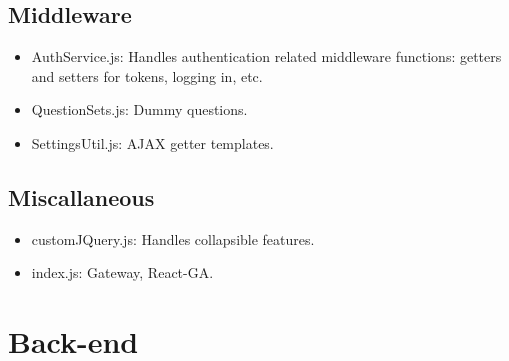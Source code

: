 \documentclass[letterpaper, 10 pt]{report}
\begin{document}
\subsection{Middleware}
\begin{itemize}
\item AuthService.js: Handles authentication related middleware functions: getters and setters for tokens, logging in, etc.
\item QuestionSets.js: Dummy questions.
\item SettingsUtil.js: AJAX getter templates.
\end{itemize}

\subsection{Miscallaneous}
\begin{itemize}
\item customJQuery.js: Handles collapsible features.
\item index.js: Gateway, React-GA.
\end{itemize}
\newpage

\section{Back-end}
\end{document}

